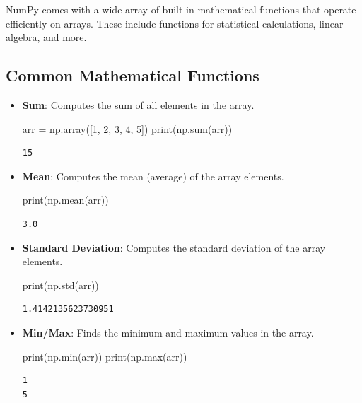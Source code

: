 \documentclass[
  letterpaper,
  DIV=11,
  numbers=noendperiod]{scrreprt}
\newenvironment{Shaded}{\begin{snugshade}}{\end{snugshade}}
\newcommand{\BuiltInTok}[1]{\textcolor[rgb]{0.00,0.23,0.31}{#1}}
\newcommand{\DecValTok}[1]{\textcolor[rgb]{0.68,0.00,0.00}{#1}}
\newcommand{\NormalTok}[1]{\textcolor[rgb]{0.00,0.23,0.31}{#1}}
\newcommand{\OperatorTok}[1]{\textcolor[rgb]{0.37,0.37,0.37}{#1}}
\begin{document}
NumPy comes with a wide array of built-in mathematical functions that
operate efficiently on arrays. These include functions for statistical
calculations, linear algebra, and more.

\hypertarget{common-mathematical-functions}{%
\subsection{Common Mathematical
Functions}\label{common-mathematical-functions}}

\begin{itemize}
\item
  \textbf{Sum}: Computes the sum of all elements in the array.

\begin{Shaded}
\begin{Highlighting}[]
\NormalTok{arr }\OperatorTok{=}\NormalTok{ np.array([}\DecValTok{1}\NormalTok{, }\DecValTok{2}\NormalTok{, }\DecValTok{3}\NormalTok{, }\DecValTok{4}\NormalTok{, }\DecValTok{5}\NormalTok{])}
\BuiltInTok{print}\NormalTok{(np.}\BuiltInTok{sum}\NormalTok{(arr)) }
\end{Highlighting}
\end{Shaded}

\begin{verbatim}
15
\end{verbatim}
\item
  \textbf{Mean}: Computes the mean (average) of the array elements.

\begin{Shaded}
\begin{Highlighting}[]
\BuiltInTok{print}\NormalTok{(np.mean(arr)) }
\end{Highlighting}
\end{Shaded}

\begin{verbatim}
3.0
\end{verbatim}
\item
  \textbf{Standard Deviation}: Computes the standard deviation of the
  array elements.

\begin{Shaded}
\begin{Highlighting}[]
\BuiltInTok{print}\NormalTok{(np.std(arr))}
\end{Highlighting}
\end{Shaded}

\begin{verbatim}
1.4142135623730951
\end{verbatim}
\item
  \textbf{Min/Max}: Finds the minimum and maximum values in the array.

\begin{Shaded}
\begin{Highlighting}[]
\BuiltInTok{print}\NormalTok{(np.}\BuiltInTok{min}\NormalTok{(arr))  }
\BuiltInTok{print}\NormalTok{(np.}\BuiltInTok{max}\NormalTok{(arr))  }
\end{Highlighting}
\end{Shaded}

\begin{verbatim}
1
5
\end{verbatim}
\end{itemize}
\end{document}
